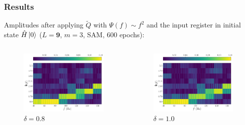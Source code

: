 \documentclass{beamer}
\begin{document}
\begin{frame}
\frametitle{Results}
Amplitudes after applying $\tilde{Q}$ with $\Psi(f) \sim f^2$ and the input register in initial state $\hat{H} \ket{0}$ ($L=\boldsymbol{9}$, $m=3$, SAM, 600 epochs):
\begin{columns}
\begin{column}{0.5\textwidth}
\begin{figure}
\centering
\includegraphics[width=\textwidth]{im/Q_amp_quadratic_0.8_H.pdf}
\caption{$\delta =0.8$}
\end{figure}
\end{column}
\begin{column}{0.5\textwidth}
\begin{figure}
\centering
\includegraphics[width=\textwidth]{im/Q_amp_quadratic_1.0_H.pdf}
\caption{$\delta =1.0$}
\end{figure} 
\end{column}
\end{columns}
\end{frame}
\end{document}
